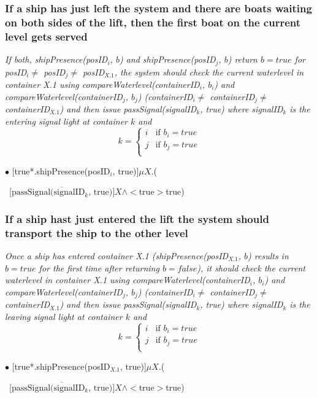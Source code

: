 \subsubsection{If a ship has just left the system and there are boats waiting on both sides of the lift, then the first boat on the current level gets served}
\textit{If both, shipPresence(posID$_i$, $b$) and shipPresence(posID$_j$, $b$) return $b = true$ for posID$_i \neq$ posID$_j \neq$ posID$_{X.1}$, the system should check the current waterlevel in container X.1 using compareWaterlevel(containerID$_i$, $b_i$) and \linebreak compareWaterlevel(containerID$_j$, $b_j$) (containerID$_i \neq$ containerID$_j \neq$ \linebreak containerID$_{X.1}$) and then issue passSignal(signalID$_k$, true) where signalID$_k$ is the entering signal light at container $k$ and
		\begin{equation*}
		k = 
		\begin{cases}
		i & \text{if } b_i = true\\
		j & \text{if } b_j = true\\
		\end{cases}
		\end{equation*}
}\vspace{0.3cm}

$ \bullet $ [true*.shipPresence(posID$_i$, true)]$ \mu X$.(
\begin{flushright}
	~[$ \overline{\textrm{passSignal(signalID$_k$, true)}} ]X \wedge <$true$>$true)
\end{flushright}
	
\subsubsection{If a ship hast just entered the lift the system should transport the ship to the other level}
\textit{Once a ship has entered container X.1 (shipPresence(posID$_{X.1}$, $b$) results in $b = true$ for the first time after returning $b = false$), it should check the current waterlevel in container X.1 using compareWaterlevel(containerID$_i$, $b_i$) and \linebreak compareWaterlevel(containerID$_j$, $b_j$) (containerID$_i \neq$ containerID$_j \neq$ \linebreak containerID$_{X.1}$) and then issue passSignal(signalID$_k$, true) where signalID$_k$ is the leaving signal light at container $k$ and
		\begin{equation*}
		k = 
		\begin{cases}
		i & \text{if } b_i = true\\
		j & \text{if } b_j = true\\
		\end{cases}
		\end{equation*}
}\vspace{0.3cm}

$ \bullet $ [true*.shipPresence(posID$_{X.1}$, true)]$ \mu X$.(
\begin{flushright}
	~[$ \overline{\textrm{passSignal(signalID$_k$, true)}} ]X \wedge <$true$>$true)
\end{flushright}